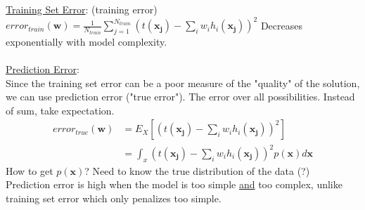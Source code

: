 \underline{Training Set Error}:  (training error) \hfill \\
$\displaystyle  error_{train}(\bm{w}) = \frac{1}{N_{train}} \sum_{j=1}^{N_{train}}(t(\bm{x_j})-\sum_{i} w_i h_i(\bm{x_j}))^2$
Decreases exponentially with model complexity.  
\hfill \\  \hfill \\

\underline{Prediction Error}:   \hfill \\
Since the training set error can be a poor measure of the "quality" of the solution, we can use prediction error ("true error").  
The error over all possibilities.   Instead of sum, take expectation. 
\begin{align*}
	error_{true}(\bm{w}) &= E_X[(t(\bm{x_j})-\sum_{i} w_i h_i(\bm{x_j}))^2] \\
					&= \int_x (t(\bm{x_j})-\sum_{i} w_i h_i(\bm{x_j}))^2 p(\bm{x}) d\bm{x}
\end{align*}
How to get $p(\bm{x})$?  Need to know the true distribution of the data (?) \hfill \\
Prediction error is high when the model is too simple \underline{and} too complex, unlike training set error which only penalizes too simple. 

